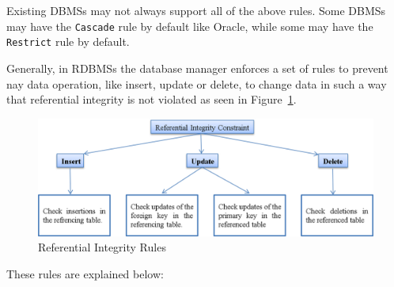 Existing \acp{DBMS} may not always support all of the above rules.  Some \acp{DBMS} may
have the \texttt{Cascade} rule by default like Oracle,   while some may have the
\texttt{Restrict} rule by default.  

Generally,   in \acp{RDBMS} the database manager enforces a set of rules to
prevent nay data operation,   like insert,   update or delete,   to change data in
such a way that referential integrity is not violated as seen in
Figure~\ref{f:RI}. 

\begin{figure}[H]
	\centering
	\includegraphics[width=.8\textwidth]{./figure/Example/RI-Figure.png}
	\caption{Referential Integrity Rules}\label{f:RI}
\end{figure}

These rules are explained below:

